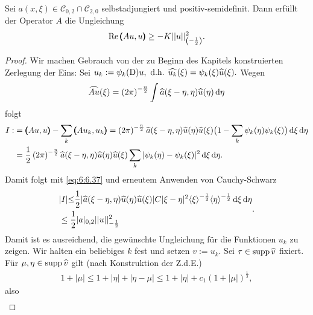 \begin{thm}
Sei $a(x,\xi)\in\mathcal{C}_{0,2}\cap\mathcal{C}_{2,0}$ selbstadjungiert und positiv-semidefinit. Dann erfüllt der Operator $A$ die Ungleichung
\begin{align}
	\operatorname{Re} \pmb(Au,u\pmb) \ge - K|| u||_{\left(-\frac{1}{2}\right)}^2.
\end{align}

\end{thm}
\begin{proof}
	Wir machen Gebrauch von der zu Beginn des Kapitels konstruierten Zerlegung der Eins: Sei $	u_k:= \psi_k(\mathrm D)u, \text{ d.h. } \widehat{u_k}(\xi) = \psi_k(\xi) \widehat{u}(\xi).$ Wegen 
\begin{align}
	\widehat{Au}(\xi) = \left(2\pi\right)^{-\frac{n}{2}}\int \widehat{a}(\xi-\eta,\eta)\widehat{u}(\eta)\,\mathrm d \eta
\end{align}	 
folgt
\begin{align}
	\begin{split} I:&=\pmb(Au,u\pmb)-\sum\limits_k \pmb(Au_k,u_k\pmb) = \left(2\pi\right)^{-\frac{n}{2}}\relax \widehat{a}(\xi-\eta,\eta)\widehat{u}(\eta)\widehat{u}(\xi)\big(1-\sum\limits_k \psi_k(\eta)\psi_k(\xi)\big)\,\mathrm d \xi\,\mathrm d\eta\\
	&= \frac{1}{2}\left(2\pi\right)^{-\frac{n}{2}} \relax \widehat{a}(\xi-\eta,\eta)\widehat{u}(\eta)\widehat{u}(\xi)\sum\limits_k\vert\psi_k(\eta)-\psi_k(\xi)\vert^2\,\mathrm d \xi\,\mathrm d\eta.
\end{split}
\end{align}
Damit folgt mit \eqref{eq:6:6.37} und erneutem Anwenden von Cauchy-Schwarz
\begin{align}
\begin{split}	&| I| {\le}\frac{1}{2}\relax|\widehat{a}(\xi-\eta,\eta)\widehat{u}(\eta)\widehat{u}(\xi)| C |\xi-\eta|^2\langle \xi\rangle^{-\frac{1}{2}} \langle\eta\rangle^{-\frac{1}{2}}\,\mathrm d \xi \,\mathrm d \eta\\ 
& \le \frac{1}{2}| a|_{0,2}|| u||_{-\frac{1}{2}}^2
\end{split}.
\end{align}
Damit ist es ausreichend, die gewünschte Ungleichung für die Funktionen $u_k$ zu zeigen. Wir halten ein beliebiges $k$ fest und setzen $v:= u_k.$ Sei $\tau\in \operatorname{supp} \widehat{v}$ fixiert. Für $\mu, \eta \in \operatorname{supp} \widehat{v}$ gilt (nach Konstruktion der Z.d.E.)
\begin{align}
	1+|\mu| \le 1+| \eta|+| \eta-\mu| \le 1+|\eta|+c_1(1+|  \mu |)^{\frac{1}{2}},
\end{align}
also
\begin{align}

\end{align}
\end{proof}
